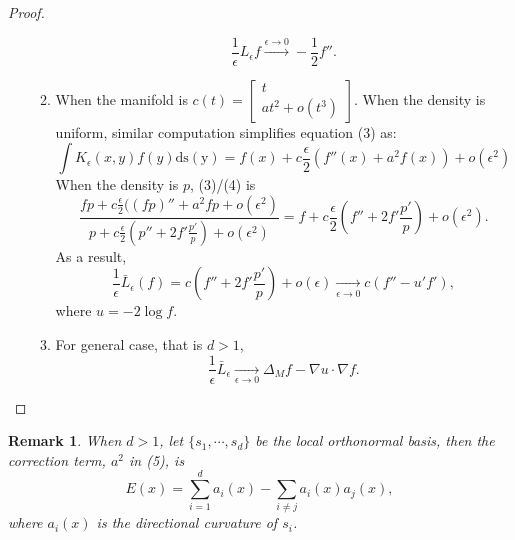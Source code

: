 \documentclass[11pt]{article}
\newcommand\<{\langle}
\renewcommand\>{\rangle}
\newtheorem{remark}{Remark}
\begin{document}
\begin{proof}
\begin{enumerate}
\begin{enumerate}
$$\frac{1}{\epsilon}L_{\epsilon}f\xrightarrow[]{\text{$\epsilon\rightarrow 0$}}-\frac{1}{2}f''.$$
\item When the manifold is $c(t)=\begin{bmatrix}t\\at^2+o(t^3)\end{bmatrix}$. When the density is uniform, similar computation simplifies equation (3) as:
\begin{equation}
\int K_\epsilon (x,y)f(y)\operatorname{ds(y)}=f(x)+c\frac{\epsilon}{2}(f''(x)+a^2f(x))+o(\epsilon^2)
\end{equation}
When the density is $p$, (3)/(4) is
$$\frac{fp+c\frac{\epsilon}{2}((fp)''+a^2fp+o(\epsilon^2)}{p+c\frac{\epsilon}{2}(p''+2f'\frac{p'}{p})+o(\epsilon^2)}=f+c\frac{\epsilon}{2}(f''+2f' \frac{p'}{p})+o(\epsilon^2).$$
As a result,
$$\frac{1}{\epsilon}\bar L_\epsilon(f)=c(f''+2f'\frac{p'}{p})+o(\epsilon)\xrightarrow[\text{$\epsilon\rightarrow 0$}]{}c(f''-u'f'),$$
where $u=-2\log f$.
\item For general case, that is $d>1$,
$$\frac{1}{\epsilon}\bar L_\epsilon\xrightarrow[\text{$\epsilon\rightarrow 0$}]{} \Delta_Mf-\nabla u\cdot\nabla f.$$
\end{enumerate}
\end{enumerate}
\end{proof}
\begin{remark}
When $d>1$, let $\{s_1,\cdots,s_d\}$ be the local orthonormal basis, then the correction term, $a^2$ in (5), is
$$E(x)=\sum_{i=1}^d a_i(x)-\sum_{i\neq j}a_i(x)a_j(x),$$
where $a_i(x)$ is the directional curvature of $s_i$.
\end{remark}
\end{document}
